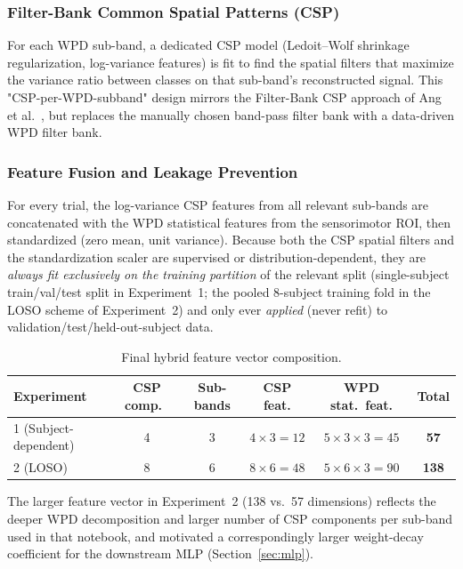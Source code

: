 \documentclass[11pt,a4paper]{article}
\begin{document}
\subsubsection{Filter-Bank Common Spatial Patterns (CSP)}
For each WPD sub-band, a dedicated CSP model \cite{ramoser2000csp} (Ledoit--Wolf shrinkage
regularization, log-variance features) is fit to find the spatial filters that maximize the variance
ratio between classes on that sub-band's reconstructed signal. This "CSP-per-WPD-subband" design
mirrors the Filter-Bank CSP approach of Ang et al.\ \cite{ang2008fbcsp}, but replaces the manually chosen
band-pass filter bank with a data-driven WPD filter bank.

\subsubsection{Feature Fusion and Leakage Prevention}
For every trial, the log-variance CSP features from all relevant sub-bands are concatenated with the
WPD statistical features from the sensorimotor ROI, then standardized (zero mean, unit variance).
Because both the CSP spatial filters and the standardization scaler are supervised or
distribution-dependent, they are \emph{always fit exclusively on the training partition} of the
relevant split (single-subject train/val/test split in Experiment~1; the pooled 8-subject training
fold in the LOSO scheme of Experiment~2) and only ever \emph{applied} (never refit) to
validation/test/held-out-subject data.

\begin{table}[H]
\centering
\caption{Final hybrid feature vector composition.}
\label{tab:feature-vector}
\begin{tabular}{lccccc}
\toprule
Experiment & CSP comp.\ & Sub-bands & CSP feat. & WPD stat.\ feat. & \textbf{Total} \\
\midrule
1 (Subject-dependent) & 4 & 3 & $4\times3=12$ & $5\times3\times3=45$ & \textbf{57} \\
2 (LOSO)               & 8 & 6 & $8\times6=48$ & $5\times6\times3=90$ & \textbf{138} \\
\bottomrule
\end{tabular}
\end{table}

The larger feature vector in Experiment~2 (138 vs.\ 57 dimensions) reflects the deeper WPD
decomposition and larger number of CSP components per sub-band used in that notebook, and motivated
a correspondingly larger weight-decay coefficient for the downstream MLP (Section~\ref{sec:mlp}).
\end{document}
